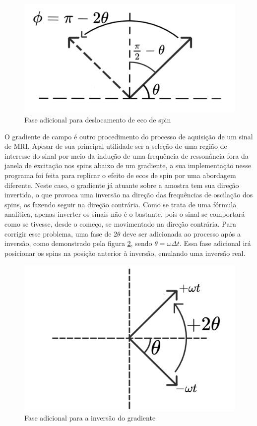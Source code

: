 \documentclass{article}
\begin{document}
\begin{figure}[H] 
    \includegraphics{spin-echo.png}
    \caption{Fase adicional para deslocamento de eco de spin }
    \label{fig:1}
\end{figure}

O gradiente de campo é outro procedimento do processo de aquisição de um sinal de MRI. Apesar de sua principal utilidade ser a 
seleção de uma região de interesse do sinal por meio da indução de uma frequência de ressonância fora da janela de excitação 
nos spins abaixo de um gradiente, a sua implementação nesse programa foi feita para replicar o efeito de ecos de spin 
por uma abordagem diferente. Neste caso, o gradiente já atuante sobre a amostra tem sua direção invertida, o que provoca uma inversão
na direção das frequências de oscilação dos spins, os fazendo seguir na direção contrária. Como se trata de uma fórmula analítica, 
apenas inverter os sinais não é o bastante, pois o sinal se comportará como se tivesse, desde o começo, se movimentado na direção 
contrária. Para corrigir esse problema, uma fase de $2\theta$ deve ser adicionada ao processo após a inversão, como demonstrado pela figura
\ref{fig:2}, sendo $\theta = \omega \Delta t$. Essa fase adicional irá posicionar os spins na posição anterior à inversão, emulando 
uma inversão real.

\begin{figure}[H] 
    \includegraphics{gradient.png}
    \caption{Fase adicional para a inversão do gradiente}
    \label{fig:2}
\end{figure}
\end{document}
